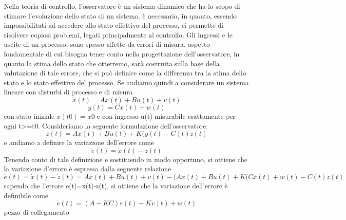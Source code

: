 \documentclass{article}
\begin{document}
Nella teoria di controllo, l'osservatore è un sistema dinamico che ha lo scopo di stimare l'evoluzione dello stato di un sistema. è necessario, in quanto, essendo impossibilitati ad accedere allo stato effettivo del processo, ci permette di risolvere copiosi problemi, legati principalmente al controllo. Gli ingressi e le uscite di un processo, sono spesso affette da errori di misura, aspetto fondamentale di cui bisogna  tener conto  nella progettazione dell'osservatore, in quanto la stima dello stato che otterremo, sarà costruita sulla base della valutazione di tale errore, che si può definire come la differenza tra la stima dello stato e lo stato effettivo del processo.
Se andiamo quindi a considerare un sistema lineare con disturbi di processo e di misura
\[\dot{x}(t)=Ax(t)+Bu(t)+v(t)\]
\[y(t)=Cx(t)+ w(t)\]
con stato iniziale $x(t0)=x0$ e con ingresso u(t) misurabile  esattamente per ogni t>=t0.
Consideriamo la seguente formulazione dell'osservatore:
\[\dot{z}(t)=Ax(t)+Bu(t)+K(y(t)-C(t)z(t)\]
e andiamo a definire la variazione dell'errore come  
\[\dot{e}(t)=\dot{x}(t)-\dot{z}(t)\]
Tenendo conto di tale definizione e sostituendo in modo opportuno, si ottiene che la variazione d'errore è espressa dalla seguente relazione
\[\dot{e}(t)=\dot{x}(t)-\dot{z}(t)=Ax(t)+Bu(t)+v(t)-(Ax(t)+Bu(t)+K(Cx(t)+w(t)-C(t)z(t)\]
sapendo che l'errore e(t)=x(t)-z(t), si ottiene che la variazione dell'errore è definibile come 
\[\dot{e}(t)=(A-KC)e(t)-Kv(t)+w(t)\]
pezzo di collegamento



 
\end{document}
